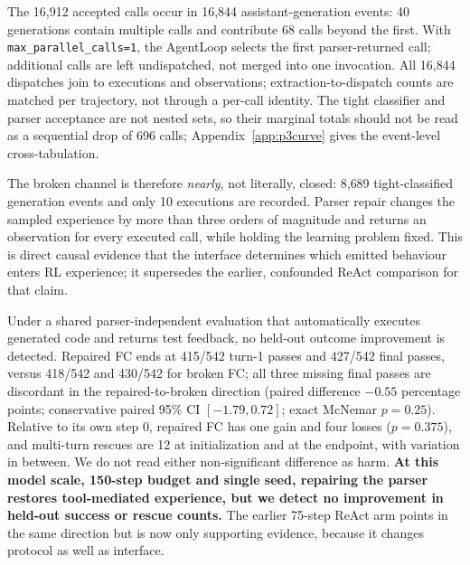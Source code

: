 The 16{,}912 accepted calls occur in 16{,}844 assistant-generation events: 40 generations contain
multiple calls and contribute 68 calls beyond the first. With \texttt{max\_parallel\_calls=1}, the AgentLoop selects the first parser-returned call;
additional calls are left undispatched, not merged into one invocation. All 16{,}844 dispatches
join to executions and observations; extraction-to-dispatch counts are matched per trajectory,
not through a per-call identity. The tight classifier and
parser acceptance are not nested sets, so their marginal totals should not be read as a sequential
drop of 696 calls; Appendix~\ref{app:p3curve} gives the event-level cross-tabulation.

The broken channel is therefore \emph{nearly}, not literally, closed: 8{,}689
tight-classified generation events and only 10 executions are recorded. Parser repair changes the sampled experience by
more than three orders
of magnitude and returns an observation for every executed call, while holding the learning
problem fixed. This is direct causal evidence that the interface determines which emitted
behaviour enters RL experience; it supersedes the earlier, confounded ReAct comparison for that
claim.

Under a shared parser-independent evaluation that automatically executes generated code and
returns test feedback, no held-out outcome improvement is detected. Repaired FC ends at 415/542 turn-1 passes and 427/542 final
passes, versus 418/542 and 430/542 for broken FC; all three missing final passes are discordant in
the repaired-to-broken direction (paired difference $-0.55$ percentage points; conservative paired
95\% CI $[-1.79,0.72]$; exact McNemar $p=0.25$). Relative to its own step 0, repaired FC
has one gain and four losses ($p=0.375$), and multi-turn rescues are 12 at initialization and at the endpoint, with variation in between. We do not read
either non-significant difference as harm. \textbf{At this model scale, 150-step budget and single
seed, repairing the parser restores tool-mediated experience, but we detect no improvement in
held-out success or rescue counts.} The earlier 75-step ReAct arm points in the
same direction but is now only supporting evidence, because it changes protocol as well as
interface.

